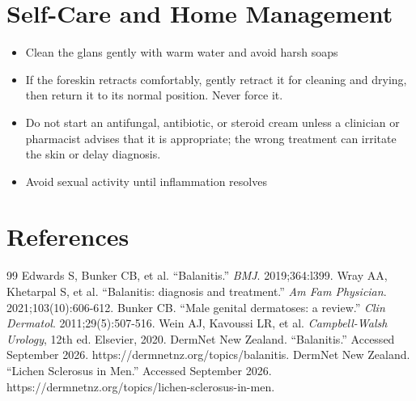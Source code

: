 \section*{Self-Care and Home Management}
\begin{itemize}
 \item Clean the glans gently with warm water and avoid harsh soaps
 \item If the foreskin retracts comfortably, gently retract it for cleaning and drying, then return it to its normal position. Never force it.
 \item Do not start an antifungal, antibiotic, or steroid cream unless a clinician or pharmacist advises that it is appropriate; the wrong treatment can irritate the skin or delay diagnosis.
 \item Avoid sexual activity until inflammation resolves
\end{itemize}

\section*{References}
\begin{thebibliography}{99}
 Edwards S, Bunker CB, et al. ``Balanitis.'' \textit{BMJ}. 2019;364:l399.
 Wray AA, Khetarpal S, et al. ``Balanitis: diagnosis and treatment.'' \textit{Am Fam Physician}. 2021;103(10):606-612.
 Bunker CB. ``Male genital dermatoses: a review.'' \textit{Clin Dermatol}. 2011;29(5):507-516.
 Wein AJ, Kavoussi LR, et al. \textit{Campbell-Walsh Urology}, 12th ed. Elsevier, 2020.
 DermNet New Zealand. ``Balanitis.'' Accessed September 2026. https://dermnetnz.org/topics/balanitis.
 DermNet New Zealand. ``Lichen Sclerosus in Men.'' Accessed September 2026. https://dermnetnz.org/topics/lichen-sclerosus-in-men.
\end{thebibliography}
